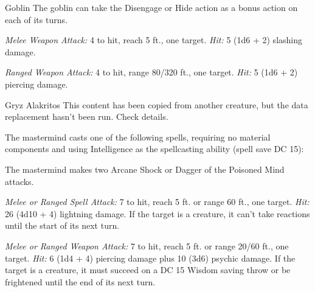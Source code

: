 \documentclass[10pt,a4paper,twoside,bg=print,twocolumn,openany,nodeprecatedcode]{dndbook}
\begin{document}
\begin{DndMonster}[float=t]{Goblin}
\DndMonsterBasics[
armor-class = {15 (\textit{leather armor})},
hit-points = {\DndDice{2d6}},
speed = {30 ft.}
]
\DndMonsterAbilityScores[
 str = 8,
 dex = 14,
 con = 10,
 int = 10,
 wis = 8,
 cha = 8
]
\DndMonsterDetails[
skills = {Stealth +6},
senses = {darkvision 60 ft., passive perception 9},
languages = {Common, Goblin},
challenge = 1/4,
]
The goblin can take the Disengage or Hide action as a bonus action on each of its turns.

\textsl{Melee Weapon Attack:} 4 to hit, reach 5 ft., one target. \textsl{Hit:} 5 (1d6 + 2) slashing damage.

\textsl{Ranged Weapon Attack:} 4 to hit, range 80/320 ft., one target. \textsl{Hit:} 5 (1d6 + 2) piercing damage.

\end{DndMonster}



\begin{DndMonster}[float=t]{Gryz Alakritos}
\DndMonsterBasics[
armor-class = {12},
hit-points = {\DndDice{15d8 + 15}},
speed = {30 ft.}
]
\DndMonsterAbilityScores[
 str = 10,
 dex = 14,
 con = 13,
 int = 18,
 wis = 16,
 cha = 14
]
\DndMonsterDetails[
saving-throws = {Int +7, Wis +6},
skills = {Arcana +7, History +7, Insight +6, Perception +6},
languages = {Common plus three other languages},
challenge = 5,
]
This content has been copied from another creature, but the data replacement hasn't been run. Check details.

The mastermind casts one of the following spells, requiring no material components and using Intelligence as the spellcasting ability (spell save DC 15):
\begin{DndMonsterSpells}
\end{DndMonsterSpells}
The mastermind makes two Arcane Shock or Dagger of the Poisoned Mind attacks.

\textsl{Melee or Ranged Spell Attack:} 7 to hit, reach 5 ft. or range 60 ft., one target. \textsl{Hit:} 26 (4d10 + 4) lightning damage. If the target is a creature, it can't take reactions until the start of its next turn.

\textsl{Melee or Ranged Weapon Attack:} 7 to hit, reach 5 ft. or range 20/60 ft., one target. \textsl{Hit:} 6 (1d4 + 4) piercing damage plus 10 (3d6) psychic damage. If the target is a creature, it must succeed on a DC 15 Wisdom saving throw or be frightened until the end of its next turn.

\end{DndMonster}
\end{document}
